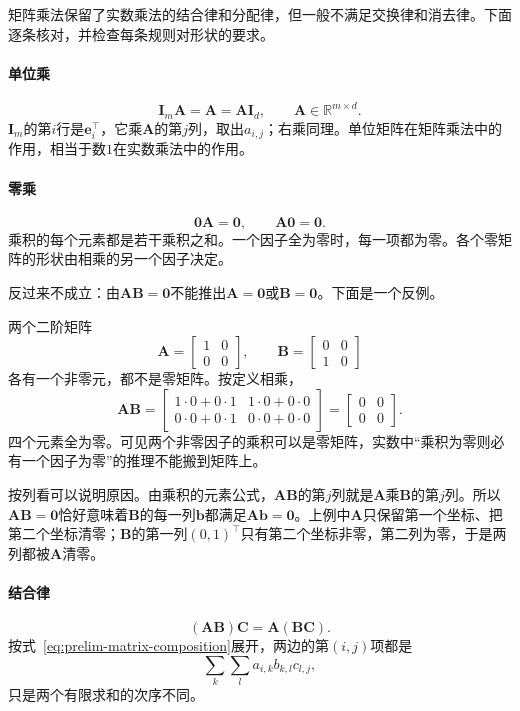 矩阵乘法保留了实数乘法的结合律和分配律，但一般不满足交换律和消去律。下面逐条核对，并检查每条规则对形状的要求。

\paragraph{单位乘}
\[
\bm I_m\bm A=\bm A=\bm A\bm I_d,\qquad
\bm A\in\mathbb R^{m\times d}.
\]
$\bm I_m$的第$i$行是$\bm e_i^\top$，它乘$\bm A$的第$j$列，取出$a_{i,j}$；右乘同理。单位矩阵在矩阵乘法中的作用，相当于数$1$在实数乘法中的作用。

\paragraph{零乘}
\[
 \bm0\bm A=\bm0,\qquad\bm A\bm0=\bm0.
\]
乘积的每个元素都是若干乘积之和。一个因子全为零时，每一项都为零。各个零矩阵的形状由相乘的另一个因子决定。

反过来不成立：由$\bm A\bm B=\bm0$不能推出$\bm A=\bm0$或$\bm B=\bm0$。下面是一个反例。
\begin{example}[反例：两个非零矩阵的乘积为零]
\label{ex:ls-zero-product-nonzero-factors}
两个二阶矩阵
\[
\bm A=\begin{bmatrix}1&0\\0&0\end{bmatrix},\qquad
\bm B=\begin{bmatrix}0&0\\1&0\end{bmatrix}
\]
各有一个非零元，都不是零矩阵。按定义相乘，
\[
 \bm A\bm B=\begin{bmatrix}1\cdot0+0\cdot1&1\cdot0+0\cdot0\\0\cdot0+0\cdot1&0\cdot0+0\cdot0\end{bmatrix}=\begin{bmatrix}0&0\\0&0\end{bmatrix}.
\]
四个元素全为零。可见两个非零因子的乘积可以是零矩阵，实数中“乘积为零则必有一个因子为零”的推理不能搬到矩阵上。
\end{example}
按列看可以说明原因。由乘积的元素公式，$\bm A\bm B$的第$j$列就是$\bm A$乘$\bm B$的第$j$列。所以$\bm A\bm B=\bm0$恰好意味着$\bm B$的每一列$\bm b$都满足$\bm A\bm b=\bm0$。上例中$\bm A$只保留第一个坐标、把第二个坐标清零；$\bm B$的第一列$(0,1)^\top$只有第二个坐标非零，第二列为零，于是两列都被$\bm A$清零。

\paragraph{结合律}
\[
 (\bm A\bm B)\bm C=\bm A(\bm B\bm C).
\]
按式~\eqref{eq:prelim-matrix-composition}展开，两边的第$(i,j)$项都是
\[
 \sum_k\sum_l a_{i,k}b_{k,l}c_{l,j},
\]
只是两个有限求和的次序不同。

